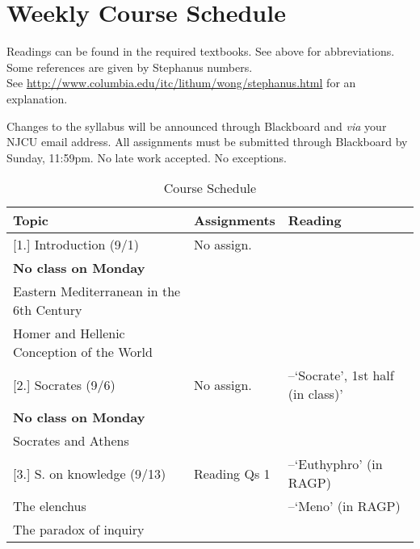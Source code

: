 \documentclass[article,oneside]{memoir}
\begin{document}
\section{Weekly Course Schedule}
Readings can be found in the required textbooks. See above for abbreviations. Some references are given by Stephanus numbers.\\ See \href{http://www.columbia.edu/itc/lithum/wong/stephanus.html}{http://www.columbia.edu/itc/lithum/wong/stephanus.html} for an explanation. 

 Changes to the syllabus will be announced through Blackboard and \emph{via} your NJCU email address.  All assignments must be submitted through Blackboard by Sunday, 11:59pm. No late work accepted. No exceptions.  

\newpage
\begin{landscape}
\begin{center}
\begin{longtable}{p{8cm}p{4cm}p{8cm}}
 
  \caption{Course Schedule} \\
  \toprule
  \textbf{Topic}   & \textbf{Assignments} & \textbf{Reading} \\
  \midrule

  
[1.] Introduction (9/1) 						& No assign.		&  \\ 
\textbf{No class on Monday}					&				& \\
Eastern Mediterranean in the 6th Century			&				& \\
Homer and Hellenic Conception of the World		 &				&    \\ [1.8\baselineskip] \hline

[2.] Socrates (9/6)	  			&  No assign.			& --`Socrate', 1st half (in class)'  \\
\textbf{No class on Monday} 		&					 &  \\ 
Socrates and Athens				&					 &  \\ [1.8\baselineskip] \hline



[3.] S. on knowledge (9/13)		& Reading Qs 1		& --`Euthyphro'  (in RAGP)   \\ 
The elenchus					&					&  --`Meno' (in RAGP) \\ %
The paradox of inquiry			&					& \\[1.8\baselineskip]  \hline %



\end{longtable}
\end{center}
\end{landscape}
\end{document}
